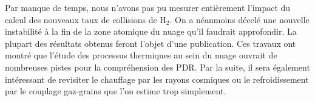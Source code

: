 \documentclass[11pt,a4paper,twoside,openright]{article}
\begin{document}
\begin{spacing}{0.98}
Par manque de temps, nous n'avons pas pu mesurer entièrement l'impact du calcul des nouveaux taux de collisions de $\mathrm{H}_2$. On a néanmoins décelé une nouvelle instabilité à la fin de la zone atomique du nuage qu'il faudrait approfondir. La plupart des résultats obtenus feront l'objet d'une publication. Ces travaux ont montré que l'étude des processus thermiques au sein du nuage ouvrait de nombreuses pistes pour la compréhension des PDR. Par la suite, il sera également intéressant de revisiter le chauffage par les rayons cosmiques ou le refroidissement par le couplage gaz-grains que l'on estime trop simplement. 

\clearpage



\clearpage
\setcounter{secnumdepth}{4}





\end{spacing}
\end{document}

